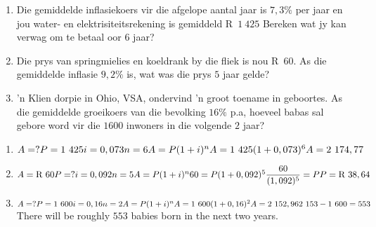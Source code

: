 \begin{exercises}{}{
    \begin{enumerate}[label=\textbf{\arabic*}.]
	\item Die gemiddelde inflasiekoers vir die afgelope aantal jaar is $7,3\%$ per jaar en jou water- en elektrisiteitsrekening is gemiddeld R~$1~425$ Bereken wat jy kan verwag om te betaal oor 6 jaar?

	\item Die prys van springmielies en koeldrank by die fliek is nou R~$60$. As die gemiddelde inflasie $9,2\%$ is, wat was die prys $5$ jaar gelde?

	\item 'n Klien dorpie in Ohio, VSA, ondervind 'n groot toename in geboortes. As die gemiddelde groeikoers van die bevolking $16\%$ p.a, hoeveel babas sal gebore word vir die $1600$ inwoners in die volgende $2$ jaar?
    \end{enumerate}
}
\end{exercises}


 \begin{solutions}{}{
\begin{enumerate}[itemsep=5pt, label=\textbf{\arabic*}. ] 


\item $A = ?\\
P=1~425\\
i=0,073\\
n=6\\
A=P(1 + i)^{n}\\
A = 1~425(1 + 0,073)^{6}\\
A = 2~174,77$
\item $A = \mbox{R }60\\
P=?\\
i=0,092\\
n=5\\
A=P(1 + i)^{n}\\
60 = P(1 + 0,092)^{5}\\
\dfrac{60}{(1,092)^5}=P\\
P = \mbox{R }38,64$
\item $A = ?\\
P=1~600\\
i=0,16\\
n=2\\
A=P(1 + i)^{n}\\
A = 1~600(1 + 0,16)^{2}\\
A = 2~152,96\\
2~153-1~600=553$\\
There will be roughly $553$ babies born in the next two years.
\end{enumerate}}
\end{solutions}


